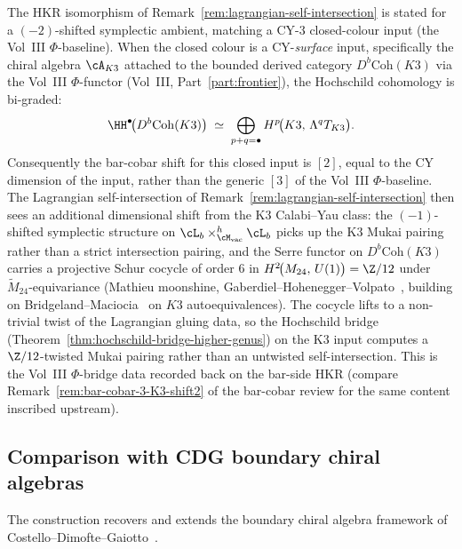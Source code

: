 \begin{remark}
\label{rem:hoch-CY2-K3-shift}
%
%
The HKR isomorphism of Remark~\ref{rem:lagrangian-self-intersection}
is stated for a $(-2)$-shifted symplectic ambient, matching a CY-$3$
closed-colour input (the Vol~III $\Phi$-baseline). When the closed
colour is a CY-\emph{surface} input, specifically the chiral algebra
$\cA_{K3}$ attached to the bounded derived category
$D^b\mathrm{Coh}(K3)$ via the Vol~III $\Phi$-functor
(Vol~III, Part~\ref{part:frontier}), the
Hochschild cohomology is bi-graded:
\[
\HH^\bullet\!\bigl(D^b\mathrm{Coh}(K3)\bigr)
\;\simeq\;
\bigoplus_{p+q=\bullet}
H^p\!\bigl(K3,\,\Lambda^q T_{K3}\bigr).
\]
Consequently the bar-cobar shift for this closed input is $[2]$,
equal to the CY dimension of the input, rather than the generic
$[3]$ of the Vol~III $\Phi$-baseline. The Lagrangian
self-intersection of Remark~\ref{rem:lagrangian-self-intersection}
then sees an additional dimensional shift from the K3
Calabi--Yau class: the $(-1)$-shifted symplectic structure on
$\cL_b\times^h_{\cM_{\mathrm{vac}}}\cL_b$ picks up the K3 Mukai
pairing rather than a strict intersection pairing, and the Serre
functor on $D^b\mathrm{Coh}(K3)$ carries a projective Schur cocycle
of order $6$ in $H^2\!\bigl(M_{24},\,U(1)\bigr)=\Z/12$ under
$\widetilde{M}_{24}$-equivariance (Mathieu moonshine,
Gaberdiel--Hohenegger--Volpato~\cite{GHV12}, building on
Bridgeland--Maciocia~\cite{BM01} on $K3$ autoequivalences). The
cocycle lifts to a non-trivial twist of the Lagrangian gluing data,
so the Hochschild bridge
(Theorem~\ref{thm:hochschild-bridge-higher-genus}) on the K3 input
computes a $\Z/12$-twisted Mukai pairing rather than an untwisted
self-intersection. This is the Vol~III $\Phi$-bridge data recorded
back on the bar-side HKR (compare
Remark~\ref{rem:bar-cobar-3-K3-shift2} of the bar-cobar
review for the same content inscribed upstream).
\end{remark}

\subsection{Comparison with CDG boundary chiral algebras}

The construction recovers and extends the boundary chiral algebra framework of Costello--Dimofte--Gaiotto~\cite{CDG20}.

